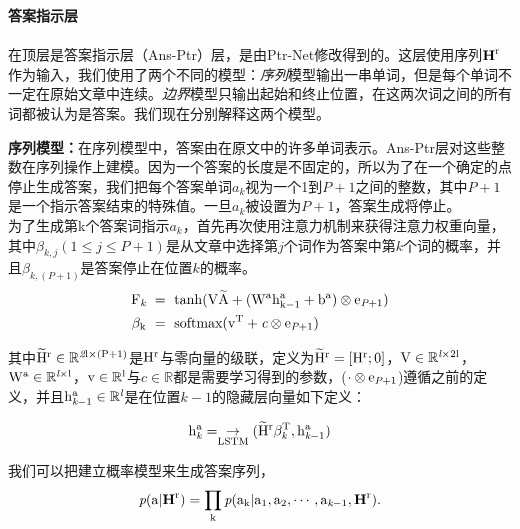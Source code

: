 \documentclass{article}
\begin{document}
\begin{CJK*}{UTF8}{gbsn}
    \vspace{2ex}
    \noindent\textbf{答案指示层}\\
    \\
    在顶层是答案指示层（Ans-Ptr）层，是由Ptr-Net修改得到的。这层使用序列$\rm \textbf{H}^{r}$作为输入，我们使用了两个不同的模型：\emph{序列}模型输出一串单词，但是每个单词不一定在原始文章中连续。\emph{边界}模型只输出起始和终止位置，在这两次词之间的所有词都被认为是答案。我们现在分别解释这两个模型。

    \vspace{2ex}
    \noindent\textbf{序列模型：}在序列模型中，答案由在原文中的许多单词表示。Ans-Ptr层对这些整数在序列操作上建模。因为一个答案的长度是不固定的，所以为了在一个确定的点停止生成答案，我们把每个答案单词$a_{k}$视为一个1到$P+1$之间的整数，其中$P+1$是一个指示答案结束的特殊值。一旦$a_{k}$被设置为$P+1$，答案生成将停止。
    \\ \noindent
    为了生成第k个答案词指示$a_{k}$，首先再次使用注意力机制来获得注意力权重向量，其中$\beta_{k, j}(1 \leqslant j \leqslant P+1)$是从文章中选择第$j$个词作为答案中第$k$个词的概率，并且$\beta_{k, (P+1)}$是答案停止在位置$k$的概率。
        \begin{align}
            \rm F_{\emph k} ~&\rm = ~ \tanh(V\widetilde{A} + (W^{a}h_{k-1}^{a}+b^{a}) \otimes e_{\emph P+1}) \\ 
            \rm \beta_{k} ~& =~ \rm softmax(v^{T}+{\emph c} \otimes e_{\emph P+1})  
        \end{align}

    其中$\rm \widetilde{H}^{r} \in \mathbb{R}^{\emph 2l \times (P+1)}$是$\rm H^{r}$与零向量的级联，定义为$\rm \widetilde{H}^{r}=\left[ H^{r}; 0 \right]$，$\rm V \in \mathbb{R}^{\emph l \times 2l}$，$\rm W^{a} \in \mathbb{R}^{\emph l \times l}$，$\rm v \in \mathbb{R}^{l}$与$c \in \mathbb{R}$都是需要学习得到的参数，($\cdot \otimes \rm e_{\emph P+1}$)遵循之前的定义，并且$\rm h_{\emph k-1}^{a} \in \mathbb{R}^{\emph l}$是在位置$k-1$的隐藏层向量如下定义：

    \begin{equation}
        \rm h_{\emph k}^{a} = \underset{LSTM}\rightarrow(\widetilde{H}^{r}\beta_{\emph k}^{T}, h_{\emph k-1}^{a})
    \end{equation}

    我们可以把建立概率模型来生成答案序列，
    \begin{equation}
        \rm \emph{p}(a|\textbf{H}^{r}) = \prod_{k}{\emph p}(a_{k} | a_{1},a_{2},\cdots,a_{\emph k-1}, \textbf{H}^{r}).
    \end{equation}


\end{CJK*}
\end{document}
